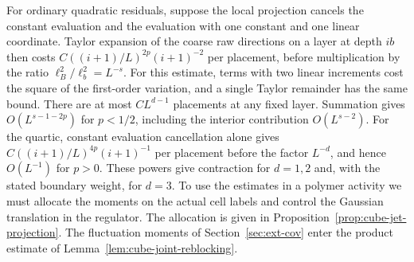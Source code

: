 \documentclass[11pt]{article}
\theoremstyle{definition}
\begin{document}
For ordinary quadratic residuals, suppose the local projection
cancels the constant evaluation and the evaluation with one
constant and one linear coordinate. Taylor expansion of the
coarse raw directions on a layer at depth \(ib\) then costs
\(C((i+1)/L)^{2p}(i+1)^{-2}\) per placement, before multiplication
by the ratio \(\ell_B^2/\ell_b^2=L^{-s}\). For this estimate,
terms with two linear increments cost the square of the
first-order variation, and a single Taylor remainder has the
same bound. There are at most \(C L^{d-1}\) placements at any
fixed layer. Summation gives \(O(L^{s-1-2p})\) for \(p<1/2\),
including the interior contribution \(O(L^{s-2})\). For the
quartic, constant evaluation cancellation alone gives
\(C((i+1)/L)^{4p}(i+1)^{-1}\) per placement before the factor
\(L^{-d}\), and hence \(O(L^{-1})\) for \(p>0\).
These powers give contraction for \(d=1,2\) and, with the stated
boundary weight, for \(d=3\). To use the estimates in a polymer
activity we must allocate the moments on the actual cell labels and
control the Gaussian translation in the regulator. The allocation
is given in Proposition~\ref{prop:cube-jet-projection}. The
fluctuation moments of Section~\ref{sec:ext-cov} enter the
product estimate of Lemma~\ref{lem:cube-joint-reblocking}.
\end{document}
